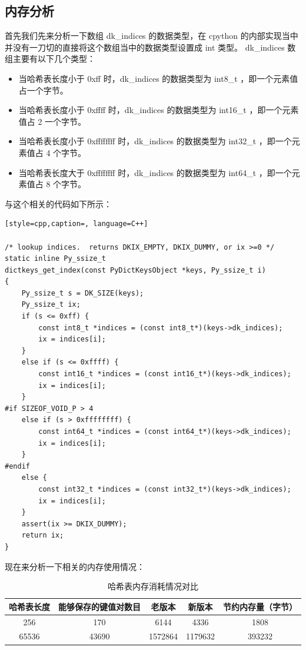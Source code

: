 \subsection{内存分析}
首先我们先来分析一下数组 dk\_indices 的数据类型，在 cpython 的内部实现当中并没有一刀切的直接将这个数组当中的数据类型设置成 int 类型。
dk\_indices 数组主要有以下几个类型：
\begin{itemize}
\item 当哈希表长度小于 0xff 时，dk\_indices 的数据类型为 int8\_t ，即一个元素值占一个字节。 
\item 当哈希表长度小于 0xffff 时，dk\_indices 的数据类型为 int16\_t ，即一个元素值占 2 一个字节。 
\item 当哈希表长度小于 0xffffffff 时，dk\_indices 的数据类型为 int32\_t ，即一个元素值占 4 个字节。 
\item 当哈希表长度大于 0xffffffff 时，dk\_indices 的数据类型为 int64\_t ，即一个元素值占 8 个字节。 
\end{itemize}
与这个相关的代码如下所示：
\begin{lstlisting}[style=cpp,caption=, language=C++]

/* lookup indices.  returns DKIX_EMPTY, DKIX_DUMMY, or ix >=0 */
static inline Py_ssize_t
dictkeys_get_index(const PyDictKeysObject *keys, Py_ssize_t i)
{
    Py_ssize_t s = DK_SIZE(keys);
    Py_ssize_t ix;
    if (s <= 0xff) {
        const int8_t *indices = (const int8_t*)(keys->dk_indices);
        ix = indices[i];
    }
    else if (s <= 0xffff) {
        const int16_t *indices = (const int16_t*)(keys->dk_indices);
        ix = indices[i];
    }
#if SIZEOF_VOID_P > 4
    else if (s > 0xffffffff) {
        const int64_t *indices = (const int64_t*)(keys->dk_indices);
        ix = indices[i];
    }
#endif
    else {
        const int32_t *indices = (const int32_t*)(keys->dk_indices);
        ix = indices[i];
    }
    assert(ix >= DKIX_DUMMY);
    return ix;
}
\end{lstlisting}
现在来分析一下相关的内存使用情况：
\begin{table}[H]
    \centering
        \begin{tabular}{|c|c|c|c|c|}
        \hline
        \textbf{哈希表长度} & \textbf{能够保存的键值对数目} & \textbf{老版本} & \textbf{新版本} & \textbf{节约内存量（字节）}  \\
        \hline
        256 & 170 & 6144 & 4336 & 1808 \\
        \hline
        65536 & 43690 & 1572864 & 1179632 & 393232 \\
        \hline
        \end{tabular}
    \caption{哈希表内存消耗情况对比}
    \label{tab:my_label}
\end{table}

